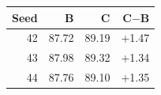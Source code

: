 \begin{tabular}{rrrr}
\toprule
Seed & B & C & C$-$B\\
\midrule
42 & 87.72 & 89.19 & +1.47 \\
43 & 87.98 & 89.32 & +1.34 \\
44 & 87.76 & 89.10 & +1.35 \\
\bottomrule
\end{tabular}
